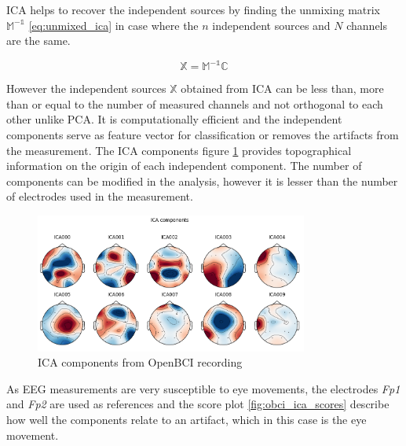 ICA helps to recover the independent sources by finding the unmixing matrix $\mathbb{M^{-1}}$ \ref{eq:unmixed_ica} in case where the $n$ independent sources and $N$ channels are the same.

\begin{equation} \label{eq:unmixed_ica}
    \mathbb{X} = \mathbb{M^{-1}C}
\end{equation}

However the independent sources $\mathbb{X}$ obtained from ICA can be less than, more than or equal to the number of measured channels and not orthogonal to each other unlike PCA. It is computationally efficient and the independent components serve as feature vector for classification or removes the artifacts from the measurement. The ICA components figure \ref{fig:obci_ica_components} provides topographical information on the origin of each independent component. The number of components can be modified in the analysis, however it is lesser than the number of electrodes used in the measurement. 

\begin{figure}[H] 
    \begin{center}
    \includegraphics[width=0.8\textwidth]{images/obci_ica_components.png}
    \caption{ICA components from OpenBCI recording}
    \label{fig:obci_ica_components}
\end{center}
\end{figure}

As EEG measurements are very susceptible to eye movements, the electrodes \textit{Fp1} and \textit{Fp2} are used as references and the score plot \ref{fig:obci_ica_scores} describe how well the components relate to an artifact, which in this case is the eye movement.

